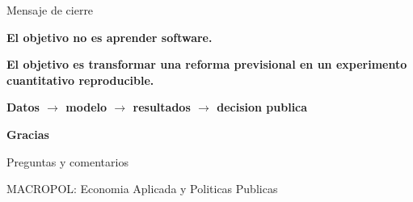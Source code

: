 \documentclass[10pt,aspectratio=169]{beamer}
\newcommand{\bigquestion}[1]{
\begin{center}
\Large\bfseries\color{macropolblue} #1
\end{center}
}
\begin{document}
\begin{frame}{Mensaje de cierre}
\bigquestion{El objetivo no es aprender software.}

\bigquestion{El objetivo es transformar una reforma previsional en un experimento cuantitativo reproducible.}

\vspace{0.3cm}
\begin{center}
\large\color{macropolgreen}\textbf{Datos $\rightarrow$ modelo $\rightarrow$ resultados $\rightarrow$ decision publica}
\end{center}
\end{frame}

\begin{frame}
\centering
\Huge\color{macropolblue}\textbf{Gracias}

\vspace{0.5cm}
\Large Preguntas y comentarios

\vspace{0.8cm}
\normalsize MACROPOL: Economia Aplicada y Politicas Publicas
\end{frame}
\end{document}
